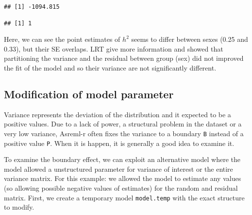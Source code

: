 \documentclass[
  12pt,
]{book}
\newenvironment{Shaded}{\begin{snugshade}}{\end{snugshade}}
\newcommand{\DecValTok}[1]{\textcolor[rgb]{0.00,0.00,0.81}{#1}}
\newcommand{\KeywordTok}[1]{\textcolor[rgb]{0.13,0.29,0.53}{\textbf{#1}}}
\newcommand{\NormalTok}[1]{#1}
\newcommand{\OperatorTok}[1]{\textcolor[rgb]{0.81,0.36,0.00}{\textbf{#1}}}
\newcommand{\StringTok}[1]{\textcolor[rgb]{0.31,0.60,0.02}{#1}}
\begin{document}
\begin{Shaded}
\end{Shaded}

\begin{verbatim}
## [1] -1094.815
\end{verbatim}

\begin{Shaded}
\end{Shaded}

\begin{verbatim}
## [1] 1
\end{verbatim}

Here, we can see the point estimates of \(h^2\) seems to differ between sexes (0.25 and 0.33), but their SE overlaps.
LRT give more information and showed that partitioning the variance and the residual between group (sex) did not improved the fit of the model and so their variance are not significantly different.

\hypertarget{modification-of-model-parameter}{%
\subsection{Modification of model parameter}\label{modification-of-model-parameter}}

Variance represents the deviation of the distribution and it expected to be a positive values.
Due to a lack of power, a structural problem in the dataset or a very low variance, Asreml-r often fixes the variance to a boundary \texttt{B} instead of a positive value \texttt{P}. When it is happen, it is generally a good idea to examine it.

To examine the boundary effect, we can exploit an alternative model where the model allowed a unstructured parameter for variance of interest or the entire variance matrix. For this example: we allowed the model to estimate any values (so allowing possible negative values of estimates) for the random and residual matrix.
First, we create a temporary model \texttt{model.temp} with the exact structure to modify.
\end{document}
